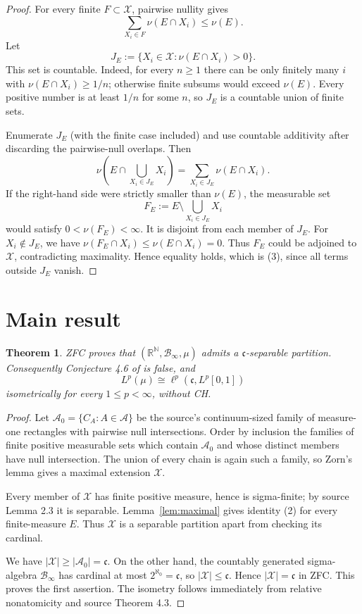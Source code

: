 \documentclass[11pt]{article}
\newtheorem{theorem}{Theorem}
\newcommand{\R}{\mathbb R}
\newcommand{\N}{\mathbb N}
\newcommand{\cB}{\mathcal B}
\newcommand{\cX}{\mathcal X}
\newcommand{\fc}{\mathfrak c}
\begin{document}
\begin{proof}
For every finite $F\subset\cX$, pairwise nullity gives
\[
 \sum_{X_i\in F}\nu(E\cap X_i)\le \nu(E).
\]
Let
\[
 J_E:=\{X_i\in\cX:\nu(E\cap X_i)>0\}.
\]
This set is countable.  Indeed, for every $n\ge1$ there can be only finitely
many $i$ with $\nu(E\cap X_i)\ge1/n$; otherwise finite subsums would exceed
$\nu(E)$.  Every positive number is at least $1/n$ for some $n$, so $J_E$ is
a countable union of finite sets.

Enumerate $J_E$ (with the finite case included) and use countable additivity
after discarding the pairwise-null overlaps.  Then
\[
 \nu\!\left(E\cap\bigcup_{X_i\in J_E}X_i\right)
   =\sum_{X_i\in J_E}\nu(E\cap X_i).
\]
If the right-hand side were strictly smaller than $\nu(E)$, the measurable
set
\[
 F_E:=E\setminus\bigcup_{X_i\in J_E}X_i
\]
would satisfy $0<\nu(F_E)<\infty$.  It is disjoint from each member of $J_E$.
For $X_i\notin J_E$, we have
$\nu(F_E\cap X_i)\le\nu(E\cap X_i)=0$.  Thus $F_E$ could be adjoined to
$\cX$, contradicting maximality.  Hence equality holds, which is (3), since
all terms outside $J_E$ vanish.
\end{proof}

\section{Main result}

\begin{theorem}\label{thm:main}
ZFC proves that $(\R^{\N},\cB_\infty,\mu)$ admits a
$\fc$-separable partition.  Consequently Conjecture 4.6 of \cite{source} is
false, and
\[
 L^p(\mu)\cong\ell^p(\fc,L^p[0,1])
\]
isometrically for every $1\le p<\infty$, without CH.
\end{theorem}

\begin{proof}
Let $\mathcal A_0=\{C_A:A\in\mathcal A\}$ be the source's continuum-sized family of
measure-one rectangles with pairwise null intersections.  Order by inclusion
the families of finite positive measurable sets which contain $\mathcal A_0$ and
whose distinct members have null intersection.  The union of every chain is
again such a family, so Zorn's lemma gives a maximal extension $\cX$.

Every member of $\cX$ has finite positive measure, hence is sigma-finite; by
source Lemma 2.3 it is separable.  Lemma~\ref{lem:maximal} gives identity (2)
for every finite-measure $E$.  Thus $\cX$ is a separable partition apart from
checking its cardinal.

We have $|\cX|\ge|\mathcal A_0|=\fc$.  On the other hand, the countably generated
sigma-algebra $\cB_\infty$ has cardinal at most
$2^{\aleph_0}=\fc$, so $|\cX|\le\fc$.  Hence $|\cX|=\fc$ in ZFC.  This proves
the first assertion.  The isometry follows immediately from relative
nonatomicity and source Theorem 4.3.
\end{proof}
\end{document}
